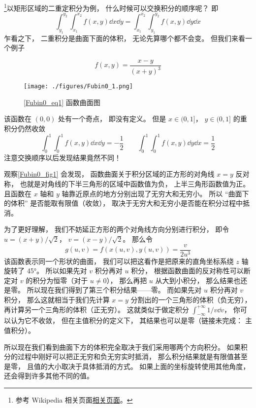 

\footnote{参考 Wikipedia 相关页面\href{https://en.wikipedia.org/wiki/Fubini's_theorem}{相关页面}。}以矩形区域的二重定积分为例， 什么时候可以交换积分的顺序呢？ 即
\begin{equation}
\int_{y_1}^{y_2}\int_{x_1}^{x_2} f(x, y) \dd{x} \dd{y} = \int_{x_1}^{x_2}\int_{y_1}^{y_2} f(x, y) \dd{y}\dd{x}
\end{equation}
乍看之下， 二重积分是曲面下面的体积， 无论先算哪个都不会变。 但我们来看一个例子

\begin{example}{}\label{Fubin0_ex1}
\begin{equation}\label{Fubin0_eq1}
f(x, y) = \frac{x - y}{(x+y)^3}
\end{equation}
\begin{figure}[ht]
\centering
\texttt{[image: ./figures/Fubin0\_1.png]}
\caption{\autoref{Fubin0_eq1} 函数曲面图} \label{Fubin0_fig1}
\end{figure}
该函数在 $(0,0)$ 处有一个奇点， 即没有定义。 但是 $x \in (0, 1]$， $y \in (0, 1]$ 的重积分仍然收敛
\begin{equation}
\int_0^1 \int_0^1 f(x,y) \dd{x} \dd{y} = -\frac{1}{2}
\qquad
\int_0^1 \int_0^1 f(x,y) \dd{y} \dd{x} = \frac{1}{2}
\end{equation}
注意交换顺序以后发现结果竟然不同！

观察\autoref{Fubin0_fig1} 会发现， 函数曲面关于积分区域的正方形的对角线 $x=y$ 反对称， 也就是对角线的下半三角形的区域中函数值为负， 上半三角形函数值为正。 且函数在 $x$ 轴和 $y$ 轴靠近原点的地方分别出现了无穷大和无穷小。 所以 “曲面下的体积” 是否能取有限值（收敛）， 取决于无穷大和无穷小是否能在积分过程中抵消。

为了更好理解， 我们不妨延正方形的两个对角线方向分别进行积分， 即令 $u = (x+y)/\sqrt{2}$， $v=(x-y)/\sqrt{2}$。 那么令
\begin{equation}
g(u,v) = f(x(u,v), y(u,v)) = \frac{v}{2u^3}
\end{equation}
该函数表示同一个形状的曲面， 我们可以把这看作是把原来的直角坐标系绕 $z$ 轴旋转了 45°。 所以如果先对 $v$ 积分再对 $u$ 积分， 根据函数曲面的反对称性可以断定对 $v$ 的积分为恒零（对于 $u\ne 0$）， 那么再把 $u$ 从大到小积分， 那么结果也还是零。 所以现在我们得到了第三个积分结果——零。 而如果先对 $u$ 积分再对 $v$ 积分， 那么这就相当于我们先计算 $x=y$ 分割出的一个三角形的体积（负无穷）， 再计算另一个三角形的体积（正无穷）。 这就类似于做定积分 $\int_{-\infty}^{+\infty}1/v\dd{v}$， 你可以认为它不收敛， 但在主值积分的定义下， 其结果也可以是零（链接未完成： 主值积分）。

所以现在我们看到曲面下方的体积完全取决于我们采用哪两个方向积分。 如果积分的过程中刚好可以把正无穷和负无穷实时抵消， 那么积分结果就是有限值甚至是零， 且值的大小取决于具体抵消的方式。 如果上面的坐标旋转使用其他角度， 还会得到许多其他不同的值。
\end{example}


